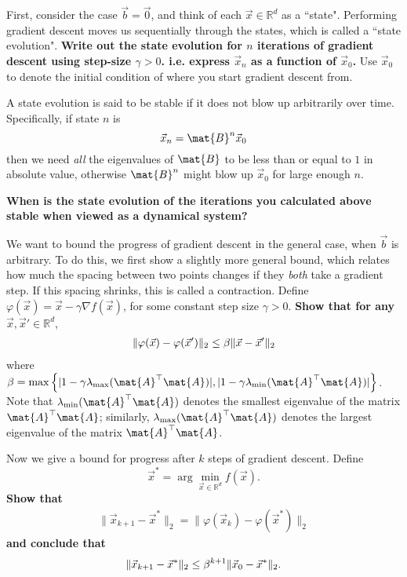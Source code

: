 \documentclass[preview]{standalone}
\begin{document}
\begin{Parts}

\Part First, consider the case $\vec{b} = \vec{0}$, and think of each $\vec{x} \in \mathbb{R}^d$
as a ``state". Performing gradient descent moves us sequentially through the states,
which is called a ``state evolution".
{\bf Write out the state
evolution for $n$ iterations of gradient descent using step-size
$\gamma > 0$. i.e. express $\vec{x}_n$ as a function of $\vec{x}_0$.}
Use $\vec{x}_0$ to denote the initial condition of where you
start gradient descent from.



\Part A state evolution is said to be stable if it does not blow up arbitrarily
over time. Specifically,
if state $n$ is $$\vec{x}_n = \mat{B}^n\vec{x}_0$$ then we need \emph{all} the eigenvalues
of $\mat{B}$ to be less than or equal to $1$ in absolute value, otherwise $\mat{B}^n$
might blow up $\vec{x}_0$ for large enough $n$.

{\bf When is the state evolution of the iterations you calculated
above stable when viewed as a dynamical system?}



\Part We want to bound the progress of gradient descent in
the general case, when $\vec{b}$ is arbitrary. To do this, we first show a
slightly more general bound,
which relates how much the spacing between two points changes if they
\textit{both} take a gradient step. If this spacing shrinks, this is called a contraction.
Define $\varphi(\vec{x}) = \vec{x} - \gamma \nabla f(\vec{x})$,
for some constant step size $\gamma > 0$.
\textbf{Show that for any} $\vec{x},\vec{x}' \in \mathbb{R}^d$,
\begin{align*}
\| \varphi(\vec{x}) - \varphi(\vec{x}') \|_2 \leq \beta \| \vec{x} - \vec{x}'\|_2
\end{align*}
where $\beta = \max \left\{ | 1 - \gamma \lambda_{\max}(\mat{A}^\top\mat{A}) |,
| 1 -\gamma \lambda_{\min}(\mat{A}^\top\mat{A}) | \right\}$.
Note that $\lambda_{\min}(\mat{A}^\top\mat{A})$
denotes the smallest eigenvalue of the matrix $\mat{A}^\top\mat{A}$; similarly,
$\lambda_{\max}(\mat{A}^\top\mat{A})$ denotes the largest eigenvalue of the matrix
$\mat{A}^\top\mat{A}$.






\Part \label{pt:x-bound} Now we give a bound for progress after $k$ steps of gradient descent. Define
$$\vec{x}^* = \arg \min_{\vec{x} \in \mathbb{R}^d} f(\vec{x}).$$
\textbf{Show that }
\begin{align*}
\| \vec{x}_{k+1} - \vec{x}^* \|_2 = \| \varphi(\vec{x}_k) - \varphi(\vec{x}^*) \|_2
\end{align*}
\textbf{ and conclude that}
\begin{align*}
\| \vec{x}_{k+1} - \vec{x}^* \|_2 \leq \beta^{k+1} \|\vec{x}_0 - \vec{x}^*\|_2.
\end{align*}




\end{Parts}
\end{document}
